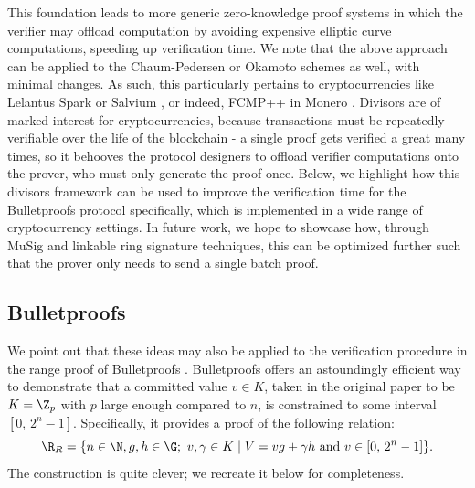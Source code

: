 \documentclass[11pt,letterpaper]{article}
\theoremstyle{definition}
\newcommand{\6}{\mathbf}
\newcommand{\7}{\mathcal}
\begin{document}
This foundation leads to more generic zero-knowledge proof systems in which the verifier may offload computation by avoiding expensive elliptic curve computations, speeding up verification time.
We note that the above approach can be applied to the Chaum-Pedersen \cite{ChaumPedersen} or Okamoto \cite{Okamoto} schemes as well, with minimal changes.
As such, this particularly pertains to cryptocurrencies like Lelantus Spark \cite{LelantusSpark} or Salvium \cite{Salvium}, or indeed, FCMP++ in Monero \cite{FCMP}.
Divisors are of marked interest for cryptocurrencies, because transactions must be repeatedly verifiable over the life of the blockchain - a single proof gets verified a great many times, so it behooves the protocol designers to offload verifier computations onto the prover, who must only generate the proof once.
Below, we highlight how this divisors framework can be used to improve the verification time for the Bulletproofs protocol \cite{Bullet} specifically, which is implemented in a wide range of cryptocurrency settings. In future work, we hope to showcase how, through MuSig \cite{MuSig} and linkable ring signature \cite{LRS} techniques, this can be optimized further such that the prover only needs to send a single batch proof.














\subsection{Bulletproofs}

We point out that these ideas may also be applied to the verification procedure in the range proof of Bulletproofs \cite{Bullet}.
Bulletproofs offers an astoundingly efficient way to demonstrate that a committed value $v \in K$, taken in the original paper to be $K = \Z_p$ with $p$ large enough compared to $n$, is constrained to some interval $[0, \, 2^n-1]$. Specifically, it provides a proof of the following relation:
$$\R_{R} = \{n \in \N, g, h \in \G; \ v, \gamma \in K \mid V = vg + \gamma h \text{ and } v \in [0, \, 2^n-1]\}.$$
The construction is quite clever; we recreate it below for completeness.
\end{document}
